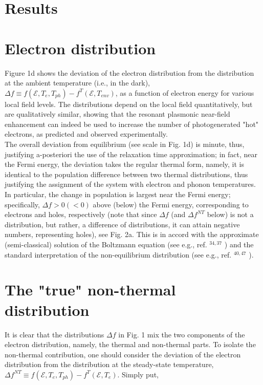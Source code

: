\documentclass[10pt]{article}
\begin{document}
\section*{Results}
\section*{Electron distribution}
Figure 1d shows the deviation of the electron distribution from the distribution at the ambient temperature (i.e., in the dark), $\Delta f \equiv f\left(\mathcal{E}, T_{e}, T_{p h}\right)-f^{T}\left(\mathcal{E}, T_{e n v}\right)$, as a function of electron energy for various local field levels. The distributions depend on the local field quantitatively, but are qualitatively similar, showing that the resonant plasmonic near-field enhancement can indeed be used to increase the number of photogenerated "hot" electrons, as predicted and observed experimentally.\\
The overall deviation from equilibrium (see scale in Fig. 1d) is minute, thus, justifying a-posteriori the use of the relaxation time approximation; in fact, near the Fermi energy, the deviation takes the regular thermal form, namely, it is identical to the population difference between two thermal distributions, thus justifying the assignment of the system with electron and phonon temperatures. In particular, the change in population is largest near the Fermi energy; specifically, $\Delta f>0(<0)$ above (below) the Fermi energy, corresponding to electrons and holes, respectively (note that since $\Delta f$ (and $\Delta f^{N T}$ below) is not a distribution, but rather, a difference of distributions, it can attain negative numbers, representing holes), see Fig. 2a. This is in accord with the approximate (semi-classical) solution of the Boltzmann equation (see e.g., ref. ${ }^{34,37}$ ) and the standard interpretation of the non-equilibrium distribution (see e.g., ref. ${ }^{40,47}$ ).

\section*{The "true" non-thermal distribution}
It is clear that the distributions $\Delta f$ in Fig. 1 mix the two components of the electron distribution, namely, the thermal and non-thermal parts. To isolate the non-thermal contribution, one should consider the deviation of the electron distribution from the distribution at the steady-state temperature, $\Delta f^{N T} \equiv f\left(\mathcal{E}, T_{e}, T_{p h}\right)-f^{T}\left(\mathcal{E}, T_{e}\right)$. Simply put,
\end{document}
